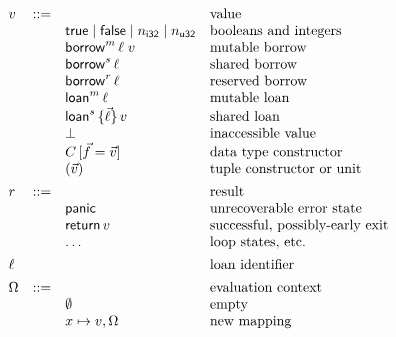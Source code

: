 \documentclass[acmsmall,screen]{acmart}
\newif\iflong
\newif\ifshort
\newcommand\kw[1]{\ensuremath{\mathsf{#1}}}
\newcommand\epanic{\kw{panic}}
\newcommand\ereturn{\kw{return}}
\newcommand\kfalse{\mathsf{false}}
\newcommand\ktrue{\mathsf{true}}
\newcommand\emborrow[2]{\ensuremath{\mathsf{borrow}^m\,#1\;#2}}
\newcommand\esborrow[1]{\ensuremath{\mathsf{borrow}^s\,#1}}
\newcommand\eiborrow[1]{\ensuremath{\mathsf{borrow}^r\,#1}}
\newcommand\esloan[2]{\ensuremath{\mathsf{loan}^s\,\{#1\}\,#2}}
\newcommand\emloan[1]{\ensuremath{\mathsf{loan}^m\,#1}}
\begin{document}
\begin{figure} %
  \smaller %
  \centering %
\fi
  \ifshort
    \ruleline{\sffamily\textbf{Reduction}}
    \centering
    \arraycolsep=4pt
  \fi
  \[
  \ifshort
  \begin{array}{ll}
  \fi
  \begin{array}[t]{llll}
    v & ::= & & \text{value} \\
      && \ktrue \mid \kfalse \mid n_{\mathsf{i32}} \mid n_{\mathsf{u32}} \iflong\mid \ldots\quad\fi & \text{booleans and integers} \\
      && \emborrow \ell v & \text{mutable borrow} \\
      && \esborrow \ell & \text{shared borrow} \\
      && \eiborrow \ell & \text{reserved borrow} \\
      && \emloan \ell & \text{mutable loan} \\
      && \esloan {\vec\ell} v & \text{shared loan} \\
      && \bot & \text{inaccessible value} \\
      && C\,[ \vec f = \vec v ] & \text{data type constructor} \\
      && (\vec v) & \text{tuple constructor \iflong($\kw{len}(\vec v) > 1$) \fi or unit \iflong($\kw{len}(\vec v) = 0$)\fi}
    \\[1ex]

    r & ::= & & \text{result} \\
      && \epanic & \text{unrecoverable error state} \\
      && \ereturn\,v & \text{successful, possibly-early exit} \\
      && \ldots & \text{loop states, etc.}
    \\[1ex]

  \ifshort
  \end{array}
  &
  \begin{array}[t]{llll}
  \fi

    \ell & & & \text{loan identifier}
    \\[1ex]

    \Omega & ::= & & \text{evaluation context} \\
      && \emptyset & \text{empty} \\
      && x \mapsto v, \Omega & \text{new mapping} \\
  \end{array}
  \ifshort
  \end{array}
  \fi
  \]
  \ifshort
\caption{The Low-Level Borrow Calculus: Syntax, Reduction Environments, Values}
  \fi
  \iflong
\caption{The Low-Level Borrow Calculus: Reduction Environments, Values}
\fi
\label{fig:values}
  \ifshort
\label{fig:syntax}
  \fi
\end{figure}
\end{document}
